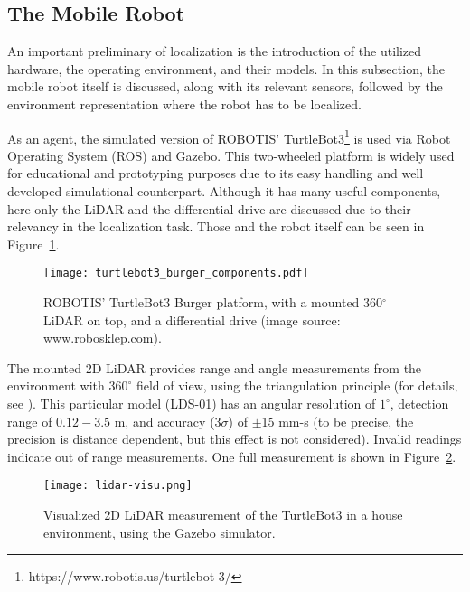 \subsection{The Mobile Robot}\label{subsec:robot}
An important preliminary of localization is the introduction of the utilized hardware, the operating environment,
and their models.
In this subsection, the mobile robot itself is discussed, along with its relevant sensors,
followed by the environment representation where the robot has to be localized.

As an agent, the simulated version of ROBOTIS' TurtleBot3\footnote{https://www.robotis.us/turtlebot-3/} is used via Robot Operating System (ROS) and Gazebo.
This two-wheeled platform is widely used for educational and prototyping purposes due to its easy handling
and well developed simulational counterpart. Although it has many useful components, here only the LiDAR and the
differential drive are discussed due to their relevancy in the localization task.
Those and the robot itself can be seen in Figure~\ref{fig:turtlebot3-burger}.
\begin{figure}[htbp]
    \centering
    \texttt{[image: turtlebot3\_burger\_components.pdf]}
    \caption[]{ROBOTIS' TurtleBot3 Burger platform, with a mounted 360$^\circ$ LiDAR on top, and a differential drive (image source: www.robosklep.com).}
    \label{fig:turtlebot3-burger}
\end{figure}

The mounted 2D LiDAR provides range and angle measurements from the environment with $360^\circ$ field of view,
using the triangulation principle (for details, see \cite{Konolige2016}).
This particular model (LDS-01) has an angular resolution of $1^\circ$, detection range of $0.12-3.5$ m,
and accuracy (3$\sigma$) of $\pm$15 mm-s (to be precise, the precision is distance dependent, but this effect is not considered).
Invalid readings indicate out of range measurements. One full measurement is shown in Figure~\ref{fig:lidar-readings}.
\begin{figure}[htbp]
    \centering
    \texttt{[image: lidar-visu.png]}
    \caption{Visualized 2D LiDAR measurement of the TurtleBot3 in a house environment, using the Gazebo simulator.}
    \label{fig:lidar-readings}
\end{figure}

